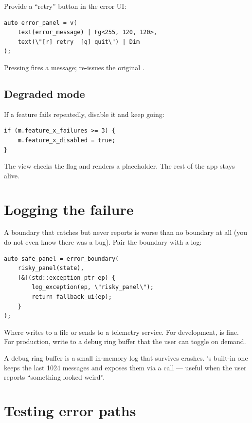 Provide a ``retry'' button in the error UI:

\begin{lstlisting}
auto error_panel = v(
    text(error_message) | Fg<255, 120, 120>,
    text(\"[r] retry  [q] quit\") | Dim
);
\end{lstlisting}

Pressing  fires a  message; 
re-issues the original .

\subsection*{Degraded mode}

If a feature fails repeatedly, disable it and keep going:

\begin{lstlisting}
if (m.feature_x_failures >= 3) {
    m.feature_x_disabled = true;
}
\end{lstlisting}

The view checks the flag and renders a placeholder. The rest of
the app stays alive.

\section{Logging the failure}

A boundary that catches but never reports is worse than no
boundary at all (you do not even know there was a bug). Pair the
boundary with a log:

\begin{lstlisting}
auto safe_panel = error_boundary(
    risky_panel(state),
    [&](std::exception_ptr ep) {
        log_exception(ep, \"risky_panel\");
        return fallback_ui(ep);
    }
);
\end{lstlisting}

Where  writes to a file or sends to a
telemetry service. For development,  is fine.
For production, write to a debug ring buffer that the user can
toggle on demand.

\begin{aside}
A debug ring buffer is a small in-memory log that survives
crashes. \maya{}'s built-in one keeps the last 1024 messages and
exposes them via a  call --- useful when
the user reports ``something looked weird''.
\end{aside}

\section{Testing error paths}

